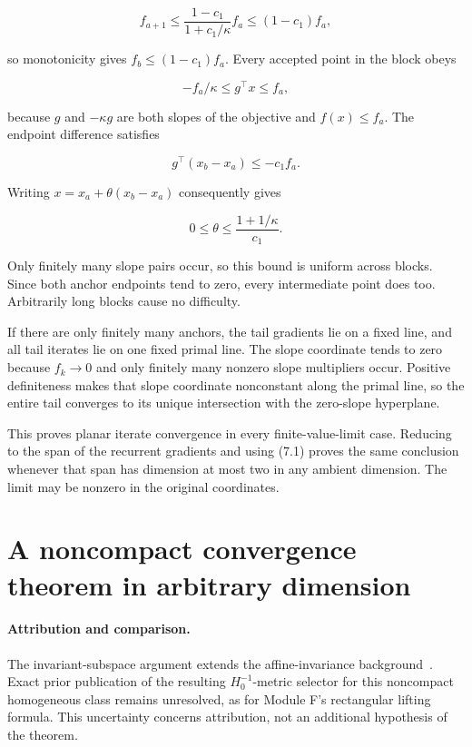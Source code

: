 \[
f_{a+1}\le\frac{1-c_1}{1+c_1/\kappa}f_a
\le(1-c_1)f_a,
\]

so monotonicity gives \(f_b\le(1-c_1)f_a\). Every accepted point in the
block obeys

\[
-f_a/\kappa\le g^\top x\le f_a,
\]

because \(g\) and \(-\kappa g\) are both slopes of the objective and
\(f(x)\le f_a\). The endpoint difference satisfies

\[
g^\top(x_b-x_a)\le-c_1 f_a.
\]

Writing \(x=x_a+\theta(x_b-x_a)\) consequently gives

\[
0\le\theta\le\frac{1+1/\kappa}{c_1}.
\]

Only finitely many slope pairs occur, so this bound is uniform across
blocks. Since both anchor endpoints tend to zero, every intermediate
point does too. Arbitrarily long blocks cause no difficulty.

If there are only finitely many anchors, the tail gradients lie on a
fixed line, and all tail iterates lie on one fixed primal line. The
slope coordinate tends to zero because \(f_k\to0\) and only finitely
many nonzero slope multipliers occur. Positive definiteness makes that
slope coordinate nonconstant along the primal line, so the entire tail
converges to its unique intersection with the zero-slope hyperplane.

This proves planar iterate convergence in every finite-value-limit case.
Reducing to the span of the recurrent gradients and using (7.1) proves
the same conclusion whenever that span has dimension at most two in any
ambient dimension. The limit may be nonzero in the original coordinates.


\setcounter{section}{7}
\setcounter{theorem}{0}
\setcounter{lemma}{0}
\setcounter{corollary}{0}
\setcounter{proposition}{0}
\setcounter{remark}{0}
\setcounter{equation}{0}
\section{A noncompact convergence theorem in arbitrary
dimension}\label{H:a-noncompact-convergence-theorem-in-arbitrary-dimension}
\paragraph{Attribution and comparison.}
The invariant-subspace argument extends the affine-invariance background~\cite[Theorem~II.1]{XW}. Exact prior publication of the resulting $H_0^{-1}$-metric selector for this noncompact homogeneous class remains unresolved, as for Module F's rectangular lifting formula. This uncertainty concerns attribution, not an additional hypothesis of the theorem.


